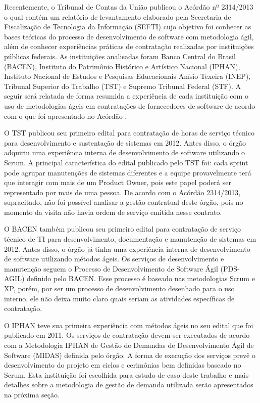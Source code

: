 Recentemente, o Tribunal de Contas da União publicou o Acórdão nº 2314/2013 o qual contém um relatório de levantamento elaborado pela Secretaria de Fiscalização de Tecnologia da Informação (SEFTI) cujo objetivo foi conhecer as bases teóricas do processo de desenvolvimento de software com metodologia ágil, além de conhecer experiências práticas de contratação realizadas por instituições públicas federais. As instituições analisadas foram Banco Central do Brasil (BACEN), Instituto do Patrimônio Histórico e Artístico Nacional (IPHAN), Instituto Nacional de Estudos e Pesquisas Educacionais Anísio Texeira (INEP), Tribunal Superior do Trabalho (TST) e Supremo Tribunal Federal (STF). A seguir será relatada de forma resumida a experiência de cada instituição com o uso de metodologias ágeis em contratações de fornecedores de software de acordo com o que foi apresentado no Acórdão  \cite{TCU:2013}.

O TST publicou seu primeiro edital para contratação de horas de serviço técnico para desenvolvimento e sustentação de sistemas em 2012. Antes disso, o órgão adquiriu uma experiência interna de desenvolvimento de software utilizando o Scrum. A principal característica do edital publicado pelo TST foi: cada sprint pode agrupar manutenções de sistemas diferentes e a equipe provavelmente terá que interagir com mais de um Product Owner, pois este papel poderá ser representado por mais de uma pessoa. De acordo com o Acórdão 2314/2013, supracitado, não foi possível analisar a gestão contratual deste órgão, pois no momento da visita não havia ordem de serviço emitida nesse contrato.

O BACEN também publicou seu primeiro edital para contratação de serviço técnico de TI para desenvolvimento, documentação e manutenção de sistemas em 2012. Antes disso, o órgão já tinha uma experiência interna de desenvolvimento de software utilizando métodos ágeis. Os serviços de desenvolvimento e manutenção seguem o Processo de Desenvolvimento de Software Ágil (PDS-AGIL) definido pelo BACEN. Esse processo é baseado nas metodologias Scrum e XP, porém, por ser um processo de desenvolvimento desenhado para o uso interno, ele não deixa muito claro quais seriam as atividades específicas de contratação. 

O IPHAN teve sua primeira experiência com métodos ágeis no seu edital que foi publicado em 2011. Os serviços de contratação devem ser executados de acordo com a Metodologia IPHAN de Gestão de Demandas de Desenvolvimento Ágil de Software (MIDAS) definida pelo órgão. A forma de execução dos serviços prevê o desenvolvimento do projeto em ciclos e cerimônias bem definidas baseado no Scrum. Esta instituição foi escolhida para estudo de caso deste trabalho e mais detalhes sobre a metodologia de gestão de demanda utilizada serão apresentados na próxima seção. 

